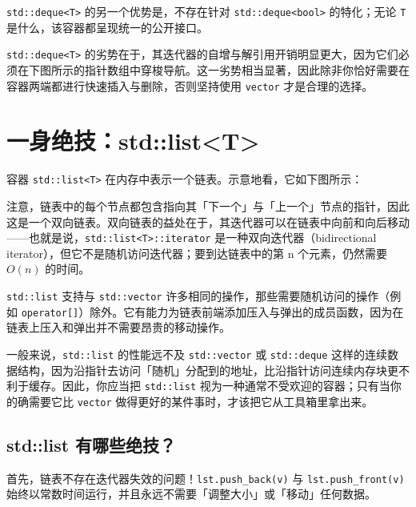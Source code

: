 \texttt{std::\allowbreak{}deque<\allowbreak{}T>\allowbreak{}} 的另一个优势是，不存在针对 \texttt{std::\allowbreak{}deque<\allowbreak{}bool>\allowbreak{}} 的特化；无论 \texttt{T} 是什么，该容器都呈现统一的公开接口。

\texttt{std::\allowbreak{}deque<\allowbreak{}T>\allowbreak{}} 的劣势在于，其迭代器的自增与解引用开销明显更大，因为它们必须在下图所示的指针数组中穿梭导航。这一劣势相当显著，因此除非你恰好需要在容器两端都进行快速插入与删除，否则坚持使用 \texttt{vector} 才是合理的选择。

\section{一身绝技：std::list<T>}

容器 \texttt{std::\allowbreak{}list<\allowbreak{}T>\allowbreak{}} 在内存中表示一个链表。示意地看，它如下图所示：


注意，链表中的每个节点都包含指向其「下一个」与「上一个」节点的指针，因此这是一个双向链表。双向链表的益处在于，其迭代器可以在链表中向前和向后移动——也就是说，\texttt{std::\allowbreak{}list<\allowbreak{}T>\allowbreak{}::\allowbreak{}iterator} 是一种双向迭代器（bidirectional iterator），但它不是随机访问迭代器；要到达链表中的第 n 个元素，仍然需要 $O(n)$ 的时间。

\texttt{std::\allowbreak{}list} 支持与 \texttt{std::\allowbreak{}vector} 许多相同的操作，那些需要随机访问的操作（例如 \texttt{operator[]}）除外。它有能力为链表前端添加压入与弹出的成员函数，因为在链表上压入和弹出并不需要昂贵的移动操作。

一般来说，\texttt{std::\allowbreak{}list} 的性能远不及 \texttt{std::\allowbreak{}vector} 或 \texttt{std::\allowbreak{}deque} 这样的连续数据结构，因为沿指针去访问「随机」分配到的地址，比沿指针访问连续内存块更不利于缓存。因此，你应当把 \texttt{std::\allowbreak{}list} 视为一种通常不受欢迎的容器；只有当你的确需要它比 \texttt{vector} 做得更好的某件事时，才该把它从工具箱里拿出来。

\subsection{std::list 有哪些绝技？}

首先，链表不存在迭代器失效的问题！\texttt{lst.\allowbreak{}push\_\allowbreak{}back(\allowbreak{}v)\allowbreak{}} 与 \texttt{lst.\allowbreak{}push\_\allowbreak{}front(\allowbreak{}v)\allowbreak{}} 始终以常数时间运行，并且永远不需要「调整大小」或「移动」任何数据。

